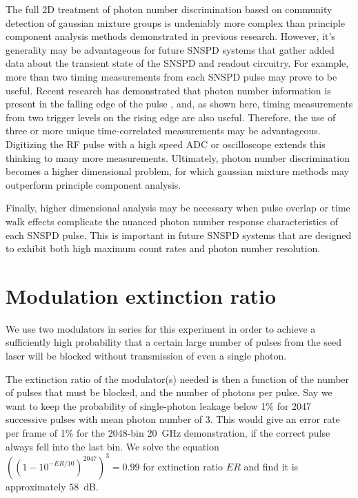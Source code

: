 \documentclass[11pt]{caltech_thesis} %
\begin{document}
The full 2D treatment of photon number discrimination based on community detection of gaussian mixture groups is undeniably more complex than principle component analysis methods demonstrated in previous research\autocite{sauer2023resolving,schapeler2023superconducting}. However, it's generality may be advantageous for future SNSPD systems that gather added data about the transient state of the SNSPD and readout circuitry. For example, more than two timing measurements from each SNSPD pulse may prove to be useful. Recent research has demonstrated that photon number information is present in the falling edge of the pulse \autocite{sauer2023resolving,schapeler2023superconducting}, and, as shown here, timing measurements from two trigger levels on the rising edge are also useful. Therefore, the use of three or more unique time-correlated measurements may be advantageous. Digitizing the RF pulse with a high speed ADC or oscilloscope extends this thinking to many more measurements. Ultimately, photon number discrimination becomes a higher dimensional problem, for which gaussian mixture methods may outperform principle component analysis.

Finally, higher dimensional analysis may be necessary when pulse overlap or time walk effects \autocite{Mueller2023} complicate the nuanced photon number response characteristics of each SNSPD pulse. This is important in future SNSPD systems that are designed to exhibit both high maximum count rates \autocite{Craiciu23} and photon number resolution.

\hypertarget{modulation-extinction-ratio}{%
\section{Modulation extinction ratio}\label{modulation-extinction-ratio}}

We use two modulators in series for this experiment in order to achieve a sufficiently high probability that a certain large number of pulses from the seed laser will be blocked without transmission of even a single photon.

The extinction ratio of the modulator(s) needed is then a function of the number of pulses that must be blocked, and the number of photons per pulse. Say we want to keep the probability of single-photon leakage below 1\% for 2047 successive pulses with mean photon number of 3. This would give an error rate per frame of 1\% for the 2048-bin 20~GHz demonstration, if the correct pulse always fell into the last bin. We solve the equation $((1 - 10^{-ER/10})^{2047})^3 = 0.99$ for extinction ratio $ER$ and find it is approximately $58$~dB.
\end{document}
